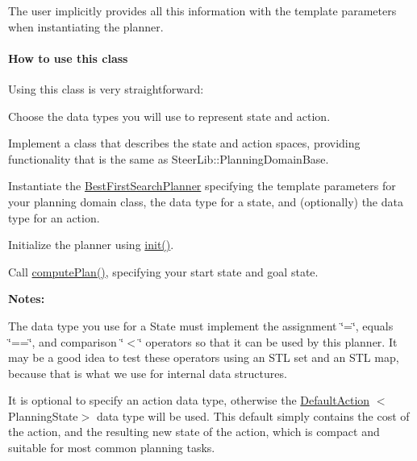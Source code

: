 The user implicitly provides all this information with the template parameters when instantiating the planner.

\paragraph*{How to use this class }

Using this class is very straightforward\-:


\begin{DoxyEnumerate}
\item Choose the data types you will use to represent state and action.
\item Implement a class that describes the state and action spaces, providing functionality that is the same as Steer\-Lib\-::\-Planning\-Domain\-Base.
\item Instantiate the \hyperlink{class_best_first_search_planner}{Best\-First\-Search\-Planner} specifying the template parameters for your planning domain class, the data type for a state, and (optionally) the data type for an action.
\item Initialize the planner using \hyperlink{class_best_first_search_planner_a00c06f79faf00907ec4906086c37776f}{init()}.
\item Call \hyperlink{class_best_first_search_planner_a777fb06939a33b3f3effb24b0dbda076}{compute\-Plan()}, specifying your start state and goal state.
\end{DoxyEnumerate}

{\bfseries  Notes\-: }


\begin{DoxyItemize}
\item The data type you use for a State must implement the assignment \char`\"{}=\char`\"{}, equals \char`\"{}==\char`\"{}, and comparison \char`\"{}$<$\char`\"{} operators so that it can be used by this planner. It may be a good idea to test these operators using an S\-T\-L set and an S\-T\-L map, because that is what we use for internal data structures.
\end{DoxyItemize}


\begin{DoxyItemize}
\item It is optional to specify an action data type, otherwise the \hyperlink{class_default_action}{Default\-Action} $<$Planning\-State$>$ data type will be used. This default simply contains the cost of the action, and the resulting new state of the action, which is compact and suitable for most common planning tasks.
\end{DoxyItemize}


